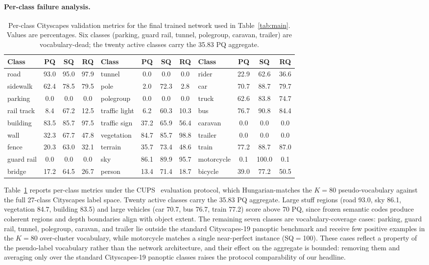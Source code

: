 \documentclass[10pt,twocolumn,letterpaper]{article}
\begin{document}
\paragraph{Per-class failure analysis.}
\begin{table}[t]
\centering
\small
\setlength{\tabcolsep}{6pt}
\begin{tabular}{l c c c l c c c l c c c}
\toprule
Class & PQ & SQ & RQ & Class & PQ & SQ & RQ & Class & PQ & SQ & RQ \\
\midrule
road & 93.0 & 95.0 & 97.9 & tunnel & 0.0 & 0.0 & 0.0 & rider & 22.9 & 62.6 & 36.6 \\
sidewalk & 62.4 & 78.5 & 79.5 & pole & 2.0 & 72.3 & 2.8 & car & 70.7 & 88.7 & 79.7 \\
parking & 0.0 & 0.0 & 0.0 & polegroup & 0.0 & 0.0 & 0.0 & truck & 62.6 & 83.8 & 74.7 \\
rail track & 8.4 & 67.2 & 12.5 & traffic light & 6.2 & 60.3 & 10.3 & bus & 76.7 & 90.8 & 84.4 \\
building & 83.5 & 85.7 & 97.5 & traffic sign & 37.2 & 65.9 & 56.4 & caravan & 0.0 & 0.0 & 0.0 \\
wall & 32.3 & 67.7 & 47.8 & vegetation & 84.7 & 85.7 & 98.8 & trailer & 0.0 & 0.0 & 0.0 \\
fence & 20.3 & 63.0 & 32.1 & terrain & 35.7 & 73.4 & 48.6 & train & 77.2 & 88.7 & 87.0 \\
guard rail & 0.0 & 0.0 & 0.0 & sky & 86.1 & 89.9 & 95.7 & motorcycle & 0.1 & 100.0 & 0.1 \\
bridge & 17.2 & 64.5 & 26.7 & person & 13.4 & 71.4 & 18.7 & bicycle & 39.0 & 77.2 & 50.5 \\
\bottomrule
\end{tabular}
\caption{Per-class Cityscapes validation metrics for the final trained network used in Table~\ref{tab:main}. Values are percentages. Six classes (parking, guard rail, tunnel, polegroup, caravan, trailer) are vocabulary-dead; the twenty active classes carry the 35.83 PQ aggregate.}
\label{tab:perclass}
\end{table}
Table~\ref{tab:perclass} reports per-class metrics under the CUPS~\cite{hahn2025cups} evaluation protocol, which Hungarian-matches the $K=80$ pseudo-vocabulary against the full 27-class Cityscapes label space. Twenty active classes carry the 35.83 PQ aggregate. Large stuff regions (road 93.0, sky 86.1, vegetation 84.7, building 83.5) and large vehicles (car 70.7, bus 76.7, train 77.2) score above 70 PQ, since frozen semantic codes produce coherent regions and depth boundaries align with object extent. The remaining seven classes are vocabulary-coverage cases: parking, guard rail, tunnel, polegroup, caravan, and trailer lie outside the standard Cityscapes-19 panoptic benchmark and receive few positive examples in the $K=80$ over-cluster vocabulary, while motorcycle matches a single near-perfect instance (SQ$=$100). These cases reflect a property of the pseudo-label vocabulary rather than the network architecture, and their effect on the aggregate is bounded: removing them and averaging only over the standard Cityscapes-19 panoptic classes raises the protocol comparability of our headline.
\end{document}
